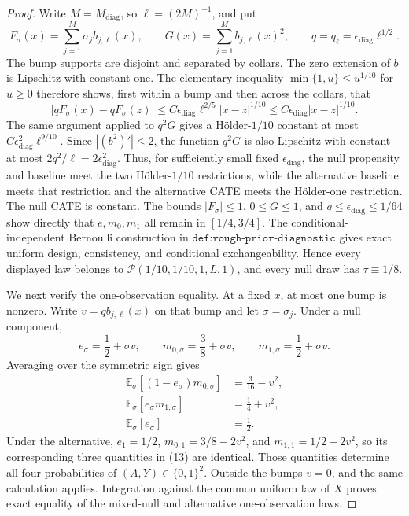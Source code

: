 \documentclass{article}
\begin{document}
\begin{proof}
Write \(M=M_{\mathrm{diag}}\), so \(\ell=(2M)^{-1}\), and put
\[
 F_\sigma(x)=\sum_{j=1}^M\sigma_jb_{j,\ell}(x),
 \qquad
 G(x)=\sum_{j=1}^M b_{j,\ell}(x)^2,
 \qquad
 q=q_\ell=\epsilon_{\mathrm{diag}}\ell^{1/2}.
\]
The bump supports are disjoint and separated by collars. The zero extension of \(b\) is Lipschitz with constant one. The elementary inequality \(\min\{1,u\}\le u^{1/10}\) for \(u\ge0\) therefore shows, first within a bump and then across the collars, that
\[
 |qF_\sigma(x)-qF_\sigma(z)|
 \le C\epsilon_{\mathrm{diag}}\ell^{2/5}|x-z|^{1/10}
 \le C\epsilon_{\mathrm{diag}}|x-z|^{1/10}.                          \tag{12}
\]
The same argument applied to \(q^2G\) gives a Hölder-\(1/10\) constant at most \(C\epsilon_{\mathrm{diag}}^2\ell^{9/10}\). Since \(|(b^2)'|\le2\), the function \(q^2G\) is also Lipschitz with constant at most \(2q^2/\ell=2\epsilon_{\mathrm{diag}}^2\). Thus, for sufficiently small fixed \(\epsilon_{\mathrm{diag}}\), the null propensity and baseline meet the two Hölder-\(1/10\) restrictions, while the alternative baseline meets that restriction and the alternative CATE meets the Hölder-one restriction. The null CATE is constant. The bounds \(|F_\sigma|\le1\), \(0\le G\le1\), and \(q\le\epsilon_{\mathrm{diag}}\le1/64\) show directly that \(e,m_0,m_1\) all remain in \([1/4,3/4]\). The conditional-independent Bernoulli construction in \(\texttt{def:rough-prior-diagnostic}\) gives exact uniform design, consistency, and conditional exchangeability. Hence every displayed law belongs to \(\mathcal P(1/10,1/10,1,L,1)\), and every null draw has \(\tau\equiv1/8\).

We next verify the one-observation equality. At a fixed \(x\), at most one bump is nonzero. Write \(v=qb_{j,\ell}(x)\) on that bump and let \(\sigma=\sigma_j\). Under a null component,
\[
 e_\sigma=\frac12+\sigma v,
 \qquad m_{0,\sigma}=\frac38+\sigma v,
 \qquad m_{1,\sigma}=\frac12+\sigma v.
\]
Averaging over the symmetric sign gives
\[
 \begin{aligned}
 \mathbb E_\sigma[(1-e_\sigma)m_{0,\sigma}]&=\frac3{16}-v^2,\\
 \mathbb E_\sigma[e_\sigma m_{1,\sigma}]&=\frac14+v^2,\\
 \mathbb E_\sigma[e_\sigma]&=\frac12.
 \end{aligned}                                                       \tag{13}
\]
Under the alternative, \(e_1=1/2\), \(m_{0,1}=3/8-2v^2\), and \(m_{1,1}=1/2+2v^2\), so its corresponding three quantities in (13) are identical. Those quantities determine all four probabilities of \((A,Y)\in\{0,1\}^2\). Outside the bumps \(v=0\), and the same calculation applies. Integration against the common uniform law of \(X\) proves exact equality of the mixed-null and alternative one-observation laws.


\end{proof}
\end{document}
